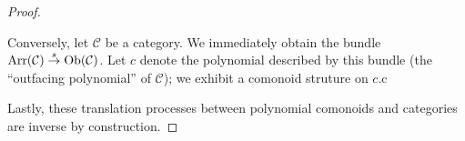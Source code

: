 \documentclass{amsart}
\begin{document}
\begin{proof}
\begin{center}
\end{center}

Conversely, let $\mathcal{C}$ be a category. We immediately obtain the
bundle ${\operatorname{Arr}(\mathcal{C})\overset{s}{\to}\operatorname{Ob}(\mathcal{C})}$. Let $c$ denote
the polynomial described by this bundle (the ``outfacing polynomial''
of $\mathcal{C}$); we exhibit a comonoid struture on $c$.c

Lastly, these translation processes between polynomial comonoids
and categories are inverse by construction.
\end{proof}
\end{document}
